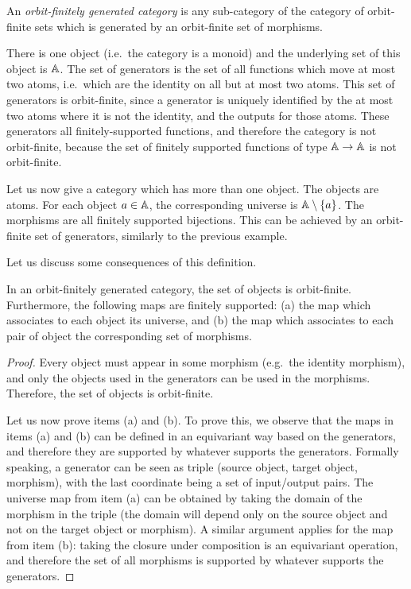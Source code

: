 \begin{definition}
    \label{def:orbit-finitely-generated-category}
    An \emph{orbit-finitely generated category} is any sub-category of the category of orbit-finite sets which is generated by an orbit-finite set of morphisms.
\end{definition}



\begin{myexample}[A monoid]
There is one object (i.e.~the category is a monoid) and the underlying set of this object is $\mathbb A$. The set of generators is the set of all functions which move at most two atoms, i.e.~which are the identity on all but at most two atoms. This set of generators is orbit-finite, since a generator is uniquely identified by the at most two atoms where it is not the identity, and the outputs for those atoms. These generators  all finitely-supported functions, and therefore the category is not orbit-finite, because the set of finitely supported functions of type $\mathbb A \to \mathbb A$ is not orbit-finite. 
\end{myexample}

\begin{myexample} Let us now give a category which has more than one object.
The objects are atoms. For each object $a \in \mathbb A$, the corresponding universe is $\mathbb A \setminus \{a\}$. The morphisms are all finitely supported bijections. This can be achieved by an orbit-finite set of generators, similarly to the previous example.
\end{myexample}

Let us discuss some consequences of this definition. 

\begin{lemma}
    In an orbit-finitely generated category, the set of objects is orbit-finite. Furthermore, the following maps are finitely supported: (a) the map which associates to each object its universe, and (b) the map which associates to each pair of object the corresponding set of morphisms.
\end{lemma}
\begin{proof}
    Every object must appear in some morphism (e.g.~the identity morphism), and only the objects used in the generators can be used in the morphisms. Therefore, the set of objects is orbit-finite. 

    Let us now prove items (a) and (b). To prove this, we observe that the maps in items (a) and (b) can be defined in an equivariant way based on the generators, and therefore they are supported by whatever supports the generators.  Formally speaking, a generator can be seen as triple (source object, target object, morphism), with the last coordinate being a set of input/output pairs. The universe map from item (a) can be obtained by taking the domain of the morphism in the triple (the domain will depend only on the source object and not on the target object or morphism). A similar argument applies for the map from item (b):  taking the closure under composition is an equivariant operation, and therefore the set of all morphisms is supported by whatever supports the generators. 
\end{proof}

